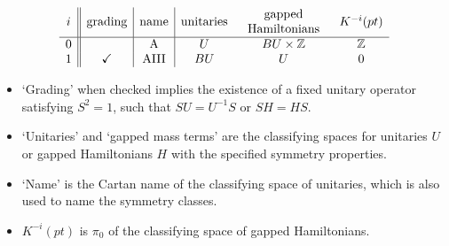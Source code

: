 \documentclass[12pt]{article}
\numberwithin{equation}{section}
\numberwithin{figure}{section}
\theoremstyle{remark}
\renewenvironment{table}[1][]{
  \begin{originaltable}[#1]
    \begin{mdframed}[linecolor=black!0,backgroundcolor=black!1]
}{
    \end{mdframed}
  \end{originaltable}
}
\def\bZ{\mathbb{Z}}
\begin{document}
\begin{table}
\[
\begin{array}{c||c|c|ccc}
i & \text{grading}& \text{name} & \text{unitaries} & \begin{tabular}{c} gapped \\ Hamiltonians\end{tabular} & K^{-i}(pt)\\
\hline
0&  & \text{A} & U & BU \times \bZ& \bZ \\
1 & \checkmark & \text{AIII} & BU & U & 0
\end{array}
\]
\medskip
\begin{itemize}
\item `Grading' when checked implies the existence of a fixed unitary operator satisfying $S^2=1$,
such that $SU=U^{-1}S$ or $SH=HS$.
\item `Unitaries' and `gapped mass terms' are the classifying spaces for unitaries $U$ or
gapped Hamiltonians $H$ with the specified symmetry properties.
\item `Name' is the Cartan name of the classifying space of unitaries, 
which is also used to name the symmetry classes.
\item $K^{-i}(pt)$ is $\pi_0$ of the classifying space of gapped Hamiltonians.
\end{itemize}
\caption{Symmetry classes: two complex ones.}
\end{table}
\end{document}
